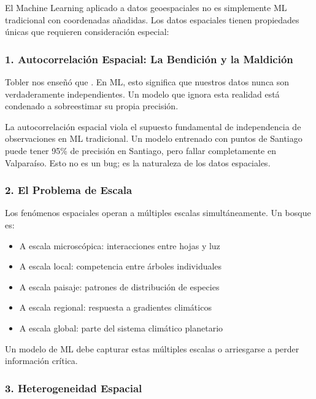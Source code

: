 \documentclass[12pt,a4paper]{article}
\begin{document}
El Machine Learning aplicado a datos geoespaciales no es simplemente ML tradicional con coordenadas añadidas. Los datos espaciales tienen propiedades únicas que requieren consideración especial:

\subsubsection{1. Autocorrelación Espacial: La Bendición y la Maldición}

\begin{reflexion}
Tobler nos enseñó que . En ML, esto significa que nuestros datos nunca son verdaderamente independientes. Un modelo que ignora esta realidad está condenado a sobreestimar su propia precisión.
\end{reflexion}

La autocorrelación espacial viola el supuesto fundamental de independencia de observaciones en ML tradicional. Un modelo entrenado con puntos de Santiago puede tener 95\% de precisión en Santiago, pero fallar completamente en Valparaíso. Esto no es un bug; es la naturaleza de los datos espaciales.

\subsubsection{2. El Problema de Escala}

Los fenómenos espaciales operan a múltiples escalas simultáneamente. Un bosque es:
\begin{itemize}
    \item A escala microscópica: interacciones entre hojas y luz
    \item A escala local: competencia entre árboles individuales
    \item A escala paisaje: patrones de distribución de especies
    \item A escala regional: respuesta a gradientes climáticos
    \item A escala global: parte del sistema climático planetario
\end{itemize}

Un modelo de ML debe capturar estas múltiples escalas o arriesgarse a perder información crítica.

\subsubsection{3. Heterogeneidad Espacial}
\end{document}
